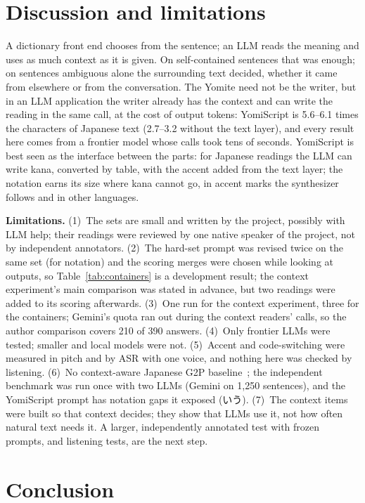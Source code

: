 \documentclass{Interspeech}
\begin{document}
\section{Discussion and limitations}

A dictionary front end chooses from the sentence; an LLM reads the meaning and uses as much context as it is given.
On self-contained sentences that was enough; on sentences ambiguous alone the surrounding text decided, whether it
came from elsewhere or from the conversation. The Yomite need not be the writer, but in an LLM application the writer
already has the context and can write the reading in the same call, at the cost of output tokens: YomiScript is
5.6--6.1 times the characters of Japanese text (2.7--3.2 without the text layer), and every result here comes from a
frontier model whose calls took tens of seconds. YomiScript is best seen as the interface between the parts: for
Japanese readings the LLM can write kana, converted by table, with the accent added from the text layer; the notation
earns its size where kana cannot go, in accent marks the synthesizer follows and in other languages.

\textbf{Limitations.} (1)~The sets are small and written by the project, possibly with LLM help; their readings were
reviewed by one native speaker of the project, not by independent annotators. (2)~The hard-set prompt was revised
twice on the same set (for notation) and the scoring merges were chosen while looking at outputs, so
Table~\ref{tab:containers} is a development result; the context experiment's main comparison was stated in advance,
but two readings were added to its scoring afterwards. (3)~One run for the context experiment, three for the
containers; Gemini's quota ran out during the context readers' calls, so the author comparison covers 210 of 390
answers. (4)~Only frontier LLMs were tested; smaller and local models were not. (5)~Accent and code-switching were
measured in pitch and by ASR with one voice, and nothing here was checked by listening. (6)~No context-aware Japanese G2P baseline~\cite{hida2022polyphone}; the independent benchmark was
run once with two LLMs (Gemini on 1{,}250 sentences), and the YomiScript prompt has notation gaps it exposed (いう).
(7)~The context items were built so that context decides; they show that LLMs use it, not how often natural text
needs it. A larger, independently annotated test with frozen
prompts, and listening tests, are the next step.

\section{Conclusion}
\end{document}
